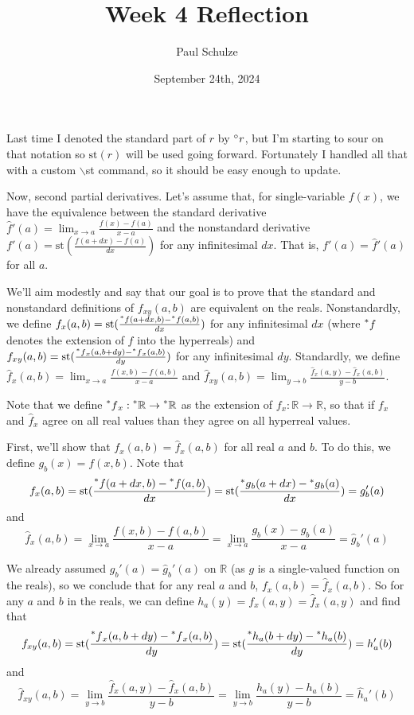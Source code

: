\documentclass{article}
\title{Week 4 Reflection}
\author{Paul Schulze}
\date{September 24th, 2024}
\newcommand{\st}[1]{\mathrm{st}(#1)}
\newcommand{\hrs}{\prescript{*}{}{\mathbb{R}}}
\newcommand{\hr}[1]{\prescript{*}{}{#1}}
\begin{document}
\maketitle

Last time I denoted the standard part of $r$ by $\prescript{\circ}{}{r}$, but I'm starting to sour on that notation so $\st{r}$ will be used going forward. Fortunately I handled all that with a custom $\backslash$st command, so it should be easy enough to update.

Now, second partial derivatives. Let's assume that, for single-variable $f(x)$, we have the equivalence between the standard derivative $\hat{f}'(a) = \lim_{x \to a} \frac{f(x) - f(a)}{x-a}$ and the nonstandard derivative $f'(a) = \st{\frac{f(a + dx) - f(a)}{dx}}$ for any infinitesimal $dx$. That is, $f'(a) = \hat{f}'(a)$ for all $a$.

We'll aim modestly and say that our goal is to prove that the standard and nonstandard definitions of $f_{xy}(a, b)$ are equivalent on the reals. Nonstandardly, we define $f_{x}(a,b) = \st{\frac{\hr f(a+dx,b)-\hr f(a,b)}{dx}}$ for any infinitesimal $dx$ (where $\hr f$ denotes the extension of $f$ into the hyperreals) and $f_{xy}(a,b) = \st{\frac{\hr f_x(a,b+dy)-\hr f_x(a,b)}{dy}}$ for any infinitesimal $dy$. Standardly, we define $\hat f_x(a,b) = \lim_{x \to a} \frac{f(x, b) - f(a, b)}{x - a}$ and $\hat f_{xy}(a,b) = \lim_{y \to b} \frac{\hat f_x(a, y) - \hat f_x(a, b)}{y - b}$.

Note that we define $\hr f_x : \hrs \to \hrs$ as the extension of $f_x : \mathbb{R} \to \mathbb{R}$, so that if $f_x$ and $\hat f_x$ agree on all real values than they agree on all hyperreal values.

First, we'll show that $f_x(a,b) = \hat f_x(a, b)$ for all real $a$ and $b$. To do this, we define $g_b(x) = f(x, b)$. Note that 
\[f_x(a,b) = \st{\frac{\hr f(a+dx,b)-\hr f(a,b)}{dx}} = \st{\frac{\hr g_b(a+dx)-\hr g_b(a)}{dx}} = g_b'(a)\]
and
\[\hat f_x(a,b) = \lim_{x \to a} \frac{f(x, b) - f(a, b)}{x - a} = \lim_{x \to a} \frac{g_b(x) - g_b(a)}{x - a} = \hat g_b'(a)\]

We already assumed $g_b'(a) = \hat g_b'(a)$ on $\mathbb{R}$ (as $g$ is a single-valued function on the reals), so we conclude that for any real $a$ and $b$, $f_x(a,b) = \hat f_x(a,b)$. So for any $a$ and $b$ in the reals, we can define $h_a(y) = f_x(a, y) = \hat f_x(a,y)$ and find that
\[f_{xy}(a,b) = \st{\frac{\hr f_x(a, b+dy) - \hr f_x(a, b)}{dy}} = \st{\frac{\hr h_a(b+dy) - \hr h_a(b)}{dy}} = h_a'(b)\]
and
\[\hat f_{xy}(a,b) = \lim_{y\to b} \frac{\hat f_x(a, y) - \hat f_x(a, b)}{y - b} = \lim_{y\to b} \frac{h_a(y) - h_a(b)}{y-b} = \hat h_a'(b)\]
\end{document}
